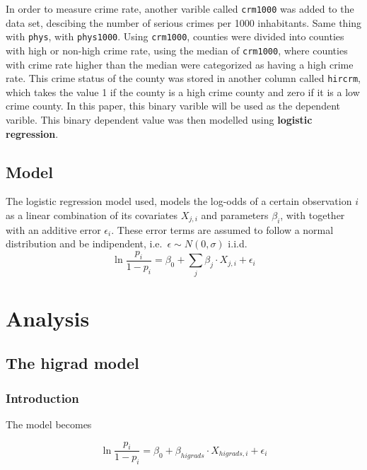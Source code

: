 \documentclass[a4paper]{article}
\begin{document}
In order to measure crime rate, another varible called \texttt{crm1000}
was added to the data set, descibing the number of serious crimes per
1000 inhabitants. Same thing with \texttt{phys}, with \texttt{phys1000}.
Using \texttt{crm1000}, counties were divided into counties with high or
non-high crime rate, using the median of \texttt{crm1000}, where
counties with crime rate higher than the median were categorized as
having a high crime rate. This crime status of the county was stored in
another column called \texttt{hircrm}, which takes the value 1 if the
county is a high crime county and zero if it is a low crime county. In
this paper, this binary varible will be used as the dependent varible.
This binary dependent value was then modelled using
\textbf{logistic regression}.

\hypertarget{model}{%
\subsection{Model}\label{model}}

The logistic regression model used, models the log-odds of a certain
observation \(i\) as a linear combination of its covariates \(X_{j,i}\)
and parameters \(\beta_i\), with together with an additive error
\(\epsilon_i\). These error terms are assumed to follow a normal
distribution and be indipendent, i.e.~\(\epsilon \sim N(0, \sigma)\)
i.i.d. \begin{equation}
  \ln{\frac{p_i}{1 - p_i}} = \beta_0 + \sum_j\beta_{j} \cdot X_{j,i} + \epsilon_i
\end{equation}

\hypertarget{analysis}{%
\section{Analysis}\label{analysis}}

\hypertarget{the-higrad-model}{%
\subsection{The higrad model}\label{the-higrad-model}}

\hypertarget{introduction-1}{%
\subsubsection{Introduction}\label{introduction-1}}

The model becomes

\begin{equation}
  \ln{\frac{p_i}{1 - p_i}} = \beta_0 + \beta_{higrads} \cdot X_{higrads,i} + \epsilon_i
\end{equation}
\end{document}
